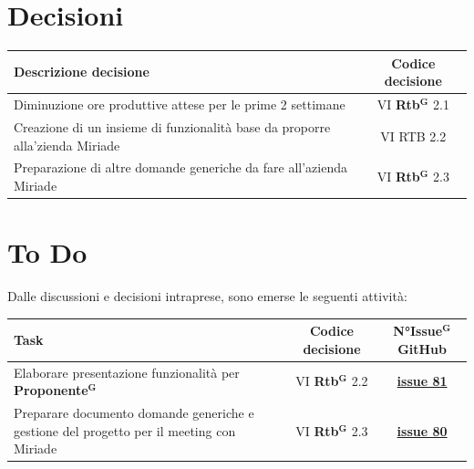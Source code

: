 \documentclass[a4paper,12pt]{article}
\newcommand{\term}[1]{\textbf{#1}$^\mathbf{G}$}
\begin{document}
\section{Decisioni}
\begin{center}
\small
\renewcommand{\arraystretch}{1.2} 
\begin{tabular}{|p{}|c|}
\hline
\rowcolor{gray!60} 
\textbf{Descrizione decisione} & \textbf{Codice decisione} \\
\hline
\rowcolor{white}
Diminuzione ore produttive attese per le prime 2 settimane & VI \term{Rtb} 2.1 \\
\hline
\rowcolor{gray!20}
Creazione di un insieme di funzionalità base da proporre alla'zienda Miriade & VI RTB 2.2 \\
\hline
\rowcolor{white}
Preparazione di altre domande generiche da fare all'azienda Miriade & VI \term{Rtb} 2.3 \\
\hline
\end{tabular}
\end{center}

\section{To Do}
Dalle discussioni e decisioni intraprese, sono emerse le seguenti attività:

\begin{center}
\small
\renewcommand{\arraystretch}{1.2} 
\begin{tabular}{|p{}|c|c|}
\hline
\rowcolor{gray!60} 
\textbf{Task} & \textbf{Codice decisione} & \textbf{N°\term{Issue} GitHub} \\
\hline
\rowcolor{white}
Elaborare presentazione funzionalità per \term{Proponente} & VI \term{Rtb} 2.2 & \href{https://github.com/SWE-BitByBit/SWE-project/issues/81}{\textbf{issue 81}} \\
\hline
\rowcolor{gray!20}
Preparare documento domande generiche e gestione del progetto per il meeting con Miriade & VI \term{Rtb} 2.3 & \href{https://github.com/SWE-BitByBit/SWE-project/issues/80}{\textbf{issue 80}} \\
\hline
\end{tabular}
\end{center}
\end{document}
